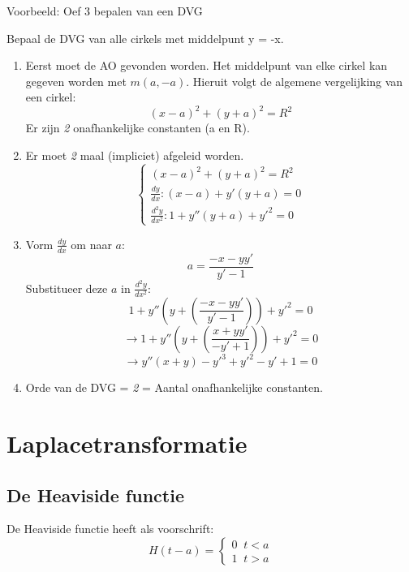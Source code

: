 \documentclass[12pt]{report}
\newcommand{\example}[2]{
      \hrulefill
      
      Voorbeeld: #1
      
      #2
      
      \hrulefill
}
\begin{document}
\example{Oef 3 bepalen van een DVG}
{
  Bepaal de DVG van alle cirkels met middelpunt y = -x.
  \begin{enumerate}
   \item Eerst moet de AO gevonden worden. Het middelpunt van elke cirkel kan gegeven worden met $m(a, -a).$
    Hieruit volgt de algemene vergelijking van een cirkel: $$(x - a)^2 + (y + a)^2 = R^2$$
    Er zijn \textit{2} onafhankelijke constanten (a en R).
   \item Er moet \textit{2} maal (impliciet) afgeleid worden.
   \[
      \begin{cases}
       (x - a)^2 + (y + a)^2 = R^2 \\
       \frac{dy}{dx} : (x-a) + y'(y+a) = 0 \\
       \frac{d^2y}{dx^2} : 1 + y''(y + a) + y'^2 = 0
      \end{cases}
   \]
   \item
    Vorm $\frac{dy}{dx}$ om naar $a$:
    $$a = \frac{-x - yy'}{y' - 1}$$
    Substitueer deze $a$ in $\frac{d^2y}{dx^2}$:
    $$1 + y''(y + (\frac{-x - yy'}{y' - 1})) + y'^2 = 0$$
    $$\rightarrow 1 + y''(y + (\frac{x + yy'}{-y' + 1})) + y'^2 = 0$$
    $$\rightarrow y''(x + y) - y'^3 + y'^2 - y' + 1 = 0$$
   \item Orde van de DVG = \textit{2}  = Aantal onafhankelijke constanten.
  \end{enumerate}
}


\chapter{Laplacetransformatie}
\section{De Heaviside functie}
De Heaviside functie heeft als voorschrift:
$$H(t - a) = 
\begin{cases}
  0 \;\; t < a \\
  1 \;\; t > a
\end{cases}$$
\end{document}
